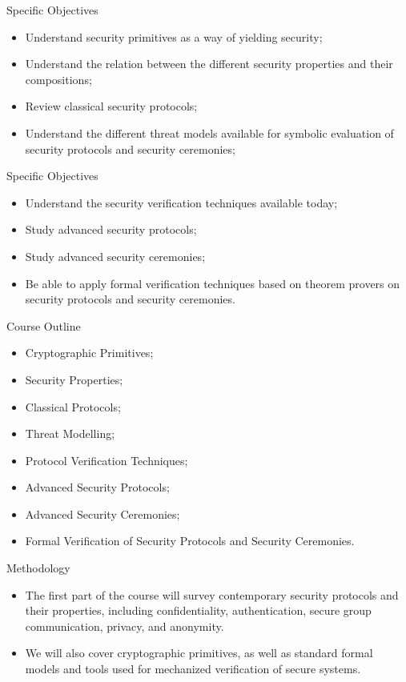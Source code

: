 \documentclass[12pt]{beamer}
\begin{document}
\begin{frame}{Specific Objectives}
\begin{itemize}
\item Understand security primitives as a way of yielding security;\pause
\item Understand the relation between the different security properties and their
compositions;\pause
\item Review classical security protocols;\pause
\item Understand the different threat models available for symbolic evaluation of security protocols and security ceremonies;
\end{itemize}
\end{frame}

\begin{frame}{Specific Objectives}
\begin{itemize}
\item Understand the security verification techniques available today;\pause
\item Study advanced security protocols;\pause
\item Study advanced security ceremonies;\pause
\item Be able to apply formal verification techniques based on theorem provers on security protocols and security ceremonies.\pause
\end{itemize}
\end{frame}


\begin{frame}{Course Outline}
\begin{itemize}
\item Cryptographic Primitives;\pause
\item Security Properties;\pause
\item Classical Protocols;\pause
\item Threat Modelling;\pause
\item Protocol Verification Techniques;\pause
\item Advanced Security Protocols;\pause
\item Advanced Security Ceremonies;\pause
\item Formal Verification of Security Protocols and Security Ceremonies.
\end{itemize}
\end{frame}


\begin{frame}{Methodology}
\begin{itemize}
\item The first part of the course will survey contemporary security protocols and their properties, including confidentiality, authentication, secure group communication, privacy, and anonymity. \pause
\item We will also cover cryptographic primitives, as well as standard formal models and tools used for mechanized verification of secure systems.
\end{itemize}
\end{frame}
\end{document}
